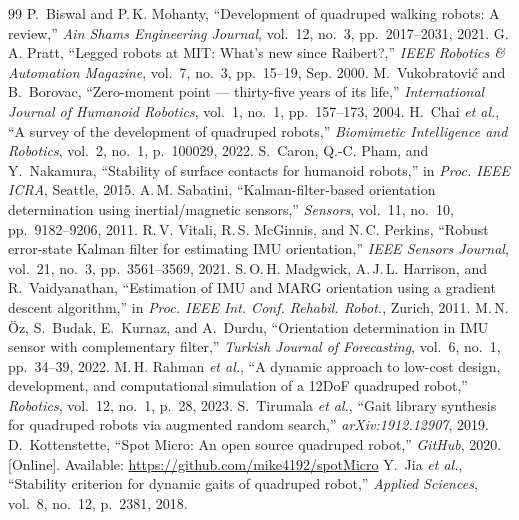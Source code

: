\documentclass[journal]{IEEEtran}
\begin{document}
\begin{thebibliography}{99}
P.~Biswal and P.\,K. Mohanty,
``Development of quadruped walking robots: A review,''
\textit{Ain Shams Engineering Journal},
vol.~12, no.~3, pp.~2017--2031, 2021.
G.\,A. Pratt,
``Legged robots at MIT: What's new since Raibert?,''
\textit{IEEE Robotics \& Automation Magazine},
vol.~7, no.~3, pp.~15--19, Sep. 2000.
M.~Vukobratovi\'{c} and B.~Borovac,
``Zero-moment point --- thirty-five years of its life,''
\textit{International Journal of Humanoid Robotics},
vol.~1, no.~1, pp.~157--173, 2004.
H.~Chai \textit{et al.},
``A survey of the development of quadruped robots,''
\textit{Biomimetic Intelligence and Robotics},
vol.~2, no.~1, p.~100029, 2022.
S.~Caron, Q.-C. Pham, and Y.~Nakamura,
``Stability of surface contacts for humanoid robots,''
in \textit{Proc. IEEE ICRA}, Seattle, 2015.
A.\,M. Sabatini,
``Kalman-filter-based orientation determination using
inertial/magnetic sensors,''
\textit{Sensors}, vol.~11, no.~10, pp.~9182--9206, 2011.
R.\,V. Vitali, R.\,S. McGinnis, and N.\,C. Perkins,
``Robust error-state Kalman filter for estimating IMU orientation,''
\textit{IEEE Sensors Journal},
vol.~21, no.~3, pp.~3561--3569, 2021.
S.\,O.\,H. Madgwick, A.\,J.\,L. Harrison, and R.~Vaidyanathan,
``Estimation of IMU and MARG orientation using a gradient
descent algorithm,''
in \textit{Proc. IEEE Int. Conf. Rehabil. Robot.}, Zurich, 2011.
M.\,N. \"{O}z, S.~Budak, E.~Kurnaz, and A.~Durdu,
``Orientation determination in IMU sensor with complementary
filter,''
\textit{Turkish Journal of Forecasting},
vol.~6, no.~1, pp.~34--39, 2022.
M.\,H. Rahman \textit{et al.},
``A dynamic approach to low-cost design, development, and
computational simulation of a 12DoF quadruped robot,''
\textit{Robotics}, vol.~12, no.~1, p.~28, 2023.
S.~Tirumala \textit{et al.},
``Gait library synthesis for quadruped robots via augmented
random search,''
\textit{arXiv:1912.12907}, 2019.
D.~Kottenstette,
``Spot Micro: An open source quadruped robot,''
\textit{GitHub}, 2020.
[Online]. Available: \url{https://github.com/mike4192/spotMicro}
Y.~Jia \textit{et al.},
``Stability criterion for dynamic gaits of quadruped robot,''
\textit{Applied Sciences}, vol.~8, no.~12, p.~2381, 2018.

\end{thebibliography}
\end{document}
